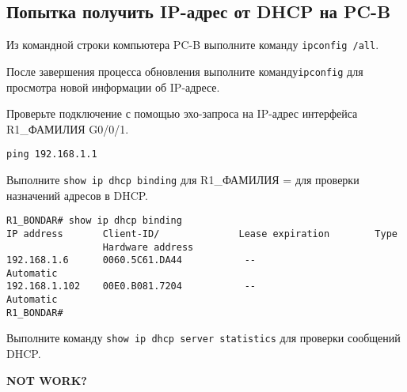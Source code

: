 \subsection{Попытка получить IP-адрес от DHCP на PC-B}

Из командной строки компьютера PC-B выполните команду \texttt{ipconfig /all}.

После завершения процесса обновления выполните команду\texttt{ipconfig} 
для просмотра новой информации об IP-адресе.

Проверьте подключение с помощью эхо-запроса
на IP-адрес интерфейса R1\_ФАМИЛИЯ G0/0/1.

\begin{verbatim}
ping 192.168.1.1
\end{verbatim}

Выполните \texttt{show ip dhcp binding} для R1\_ФАМИЛИЯ =
для проверки назначений адресов в DHCP.

\begin{verbatim}
R1_BONDAR# show ip dhcp binding 
IP address       Client-ID/              Lease expiration        Type
                 Hardware address
192.168.1.6      0060.5C61.DA44           --                     Automatic
192.168.1.102    00E0.B081.7204           --                     Automatic
R1_BONDAR#
\end{verbatim}

Выполните команду \texttt{show ip dhcp server statistics}
для проверки сообщений DHCP.

\textbf{NOT WORK?}

